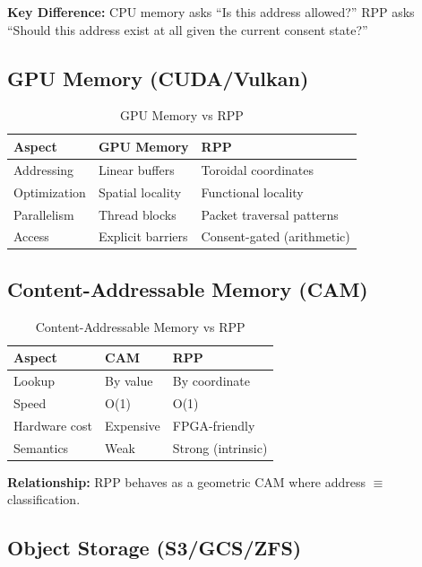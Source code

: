 \documentclass[11pt,a4paper]{article}
\begin{document}
\textbf{Key Difference:} CPU memory asks ``Is this address allowed?'' RPP asks ``Should this address exist at all given the current consent state?''

\subsection{GPU Memory (CUDA/Vulkan)}

\begin{table}[h]
\centering
\begin{tabular}{lll}
\toprule
\textbf{Aspect} & \textbf{GPU Memory} & \textbf{RPP} \\
\midrule
Addressing & Linear buffers & Toroidal coordinates \\
Optimization & Spatial locality & Functional locality \\
Parallelism & Thread blocks & Packet traversal patterns \\
Access & Explicit barriers & Consent-gated (arithmetic) \\
\bottomrule
\end{tabular}
\caption{GPU Memory vs RPP}
\end{table}

\subsection{Content-Addressable Memory (CAM)}

\begin{table}[h]
\centering
\begin{tabular}{lll}
\toprule
\textbf{Aspect} & \textbf{CAM} & \textbf{RPP} \\
\midrule
Lookup & By value & By coordinate \\
Speed & O(1) & O(1) \\
Hardware cost & Expensive & FPGA-friendly \\
Semantics & Weak & Strong (intrinsic) \\
\bottomrule
\end{tabular}
\caption{Content-Addressable Memory vs RPP}
\end{table}

\textbf{Relationship:} RPP behaves as a geometric CAM where address $\equiv$ classification.

\subsection{Object Storage (S3/GCS/ZFS)}
\end{document}
